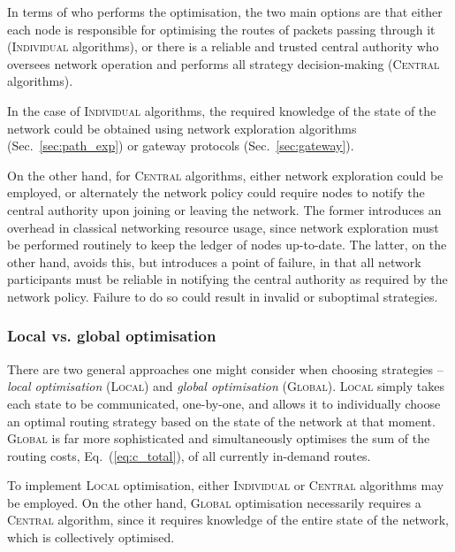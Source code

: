 \documentclass[aps, rmp, twocolumn, amsmath, amssymb, nofootinbib, superscriptaddress, longbibliography, floatfix, table-of-contents, eqsecnum]{revtex4-1}
\begin{document}
In terms of who performs the optimisation, the two main options are that either each node is responsible for optimising the routes of packets passing through it (\textsc{Individual} algorithms), or there is a reliable and trusted central authority who oversees network operation and performs all strategy decision-making (\textsc{Central} algorithms).

In the case of \textsc{Individual} algorithms, the required knowledge of the state of the network could be obtained using network exploration algorithms (Sec.~\ref{sec:path_exp}) or gateway protocols (Sec.~\ref{sec:gateway}). 

On the other hand, for \textsc{Central} algorithms, either network exploration could be employed, or alternately the network policy could require nodes to notify the central authority upon joining or leaving the network. The former introduces an overhead in classical networking resource usage, since network exploration must be performed routinely to keep the ledger of nodes up-to-date. The latter, on the other hand, avoids this, but introduces a point of failure, in that all network participants must be reliable in notifying the central authority as required by the network policy. Failure to do so could result in invalid or suboptimal strategies.

%
%

\subsubsection{Local vs. global optimisation} 

There are two general approaches one might consider when choosing strategies -- \textit{local optimisation} (\textsc{Local}) and \textit{global optimisation} (\textsc{Global}). \textsc{Local} simply takes each state to be communicated, one-by-one, and allows it to individually choose an optimal routing strategy based on the state of the network at that moment. \textsc{Global} is far more sophisticated and simultaneously optimises the sum of the routing costs, Eq.~(\ref{eq:c_total}), of all currently in-demand routes.

To implement \textsc{Local} optimisation, either \textsc{Individual} or \textsc{Central} algorithms may be employed. On the other hand, \textsc{Global} optimisation necessarily requires a \textsc{Central} algorithm, since it requires knowledge of the entire state of the network, which is collectively optimised.
\end{document}

